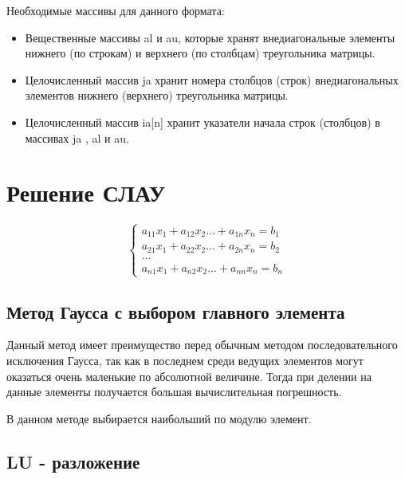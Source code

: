 \documentclass[a4paper,12pt]{article}
\begin{document}
\noindent Необходимые массивы для данного формата:
\begin{itemize}
    \item Вещественные массивы al и au, которые хранят внедиагональные элементы нижнего (по строкам) и верхнего (по столбцам) треугольника матрицы.
    \item Целочисленный массив ja хранит номера столбцов (строк) внедиагональных элементов нижнего (верхнего) треугольника матрицы.
    \item Целочисленный массив ia[n] хранит указатели начала строк (столбцов) в массивах ja , al и au.
\end{itemize}

\section{Решение СЛАУ}
\begin{equation*} 
 \begin{cases}
   a_{11}x_1 + a_{12}x_2 \ldots +  a_{1n}x_n = b_1\\ 
   a_{21}x_1 + a_{22}x_2 \ldots +  a_{2n}x_n = b_2\\ 
   \ldots\\
   a_{n1}x_1 + a_{n2}x_2 \ldots +  a_{nn}x_n = b_n
 \end{cases} 
\end{equation*}
\subsection{Метод Гаусса с выбором главного элемента}
Данный метод имеет преимущество перед обычным методом последовательного исключения Гаусса, так как в последнем среди ведущих элементов могут оказаться очень маленькие по абсолютной величине. Тогда при делении на данные элементы получается большая вычислительная погрешность.

В данном методе выбирается наибольший по модулю элемент.

\subsection{LU -  разложение}
\end{document}
